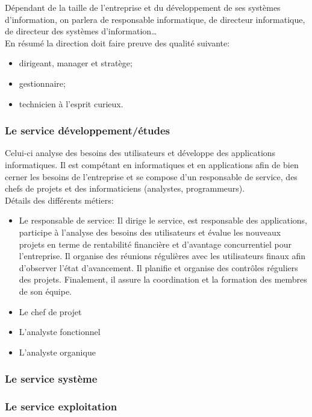 \documentclass[10pt,a4paper,oneside,titlepage]{report}
\begin{document}
Dépendant de la taille de l’entreprise et du développement de ses systèmes
d’information, on parlera de responsable informatique, de directeur
informatique, de directeur des systèmes d’information\dots\\

En résumé la direction doit faire preuve des qualité suivante:
\begin{itemize}
\item dirigeant, manager et stratège;
\item gestionnaire;
\item technicien à l'esprit curieux.
\end{itemize}

\subsubsection{Le service développement/études}
Celui-ci analyse des besoins des utilisateurs et développe des applications
informatiques. Il est compétant en informatiques et en applications afin de bien
cerner les besoins de l’entreprise et se compose d'un responsable de service,
des chefs de projets et des informaticiens (analystes, programmeurs).\\

Détails des différents métiers:
\begin{itemize}
\item Le responsable de service: Il dirige le service, est responsable des
applications, participe à l’analyse des besoins des utilisateurs et évalue les
nouveaux projets en terme de rentabilité financière et d’avantage concurrentiel
pour l’entreprise. Il organise des réunions régulières avec les utilisateurs
finaux afin d'observer l'état d’avancement. Il planifie et organise des
contrôles réguliers des projets. Finalement, il assure la coordination et
la formation des membres de son équipe.
\item Le chef de projet
\item L'analyste fonctionnel
\item L'analyste organique
\end{itemize}

\subsubsection{Le service système}

\subsubsection{Le service exploitation}
\end{document}
